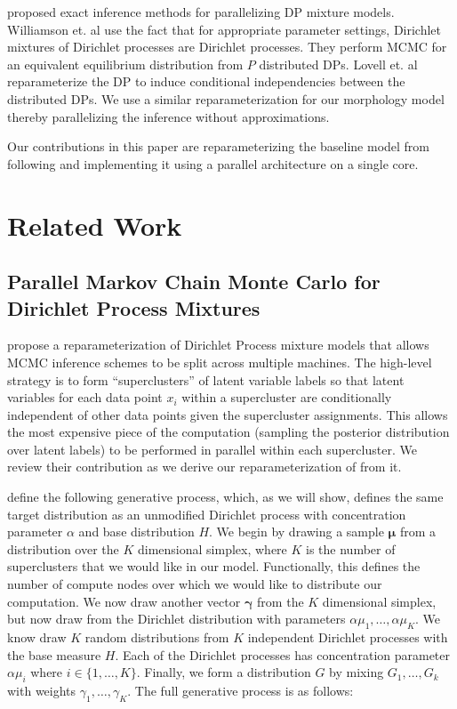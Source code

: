 \documentclass{article}
\begin{document}
\cite{lovell2012,williamsonparallel} proposed exact inference methods
for parallelizing DP mixture models. Williamson et. al \cite{williamsonparallel}
 use the fact that for appropriate parameter settings, Dirichlet mixtures of
Dirichlet processes are Dirichlet processes. They perform MCMC for an equivalent
equilibrium distribution from $P$ distributed DPs. Lovell et. al \cite{lovell2012}
 reparameterize the DP to induce conditional independencies between the 
distributed DPs. We use a similar reparameterization for our morphology
model thereby parallelizing the inference without approximations.

Our contributions in this paper are reparameterizing the baseline model
 from \cite{goldwater2011} following \cite{lovell2012} and 
implementing it using a parallel architecture on a single core.

\section{Related Work}
\label{sec:related-work}

\subsection{Parallel Markov Chain Monte Carlo for Dirichlet Process Mixtures}
\label{sec:parallel-mcmc-for-dpm}

\cite{lovell2012} propose a reparameterization of Dirichlet Process
mixture models that allows MCMC inference schemes to be split across
multiple machines. The high-level strategy is to form
``superclusters'' of latent variable labels so that latent variables
for each data point $x_i$ within a supercluster are conditionally
independent of other data points given the supercluster
assignments. This allows the most expensive piece of the computation
(sampling the posterior distribution over latent labels) to be
performed in parallel within each supercluster. We review their
contribution as we derive our reparameterization of
\cite{goldwater2011} from it.

\cite{lovell2012} define the following generative process, which, as
we will show, defines the same target distribution as an unmodified
Dirichlet process with concentration parameter $\alpha$ and base
distribution $H$. We begin by drawing a sample $\boldsymbol{\mu}$ from
a distribution over the $K$ dimensional simplex, where $K$ is the
number of superclusters that we would like in our model. Functionally,
this defines the number of compute nodes over which we would like to
distribute our computation. We now draw another vector
$\boldsymbol{\gamma}$ from the $K$ dimensional simplex, but now draw
from the Dirichlet distribution with parameters $\alpha \mu_1, \ldots,
\alpha \mu_K$. We know draw $K$ random distributions from $K$
independent Dirichlet processes with the base measure $H$. Each of the
Dirichlet processes has concentration parameter $\alpha \mu_i$ where
$i \in \{1, \ldots, K\}$. Finally, we form a distribution $G$ by
mixing $G_1, \ldots, G_k$ with weights $\gamma_1, \ldots,
\gamma_K$. The full generative process is as follows:
\end{document}

